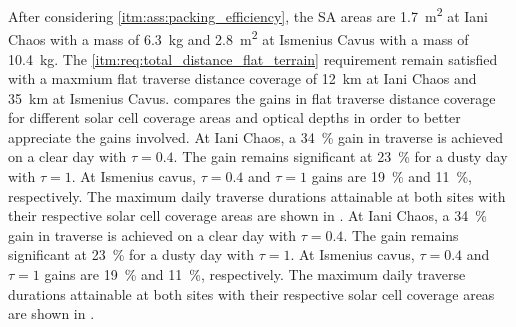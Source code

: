 After considering \ref{itm:ass:packing_efficiency}, the \ac{SA} areas are \SI{1.7}{m^{2}} at Iani Chaos with a mass of \SI{6.3}{\kilo\gram} and \SI{2.8}{m^{2}} at Ismenius Cavus with a mass of  \SI{10.4}{\kilo\gram}. The \ref{itm:req:total_distance_flat_terrain} requirement remain satisfied with
a maxmium flat traverse distance coverage of \SI{12}{\kilo\meter} at Iani Chaos and \SI{35}{\kilo\meter} at Ismenius Cavus.  compares the gains in flat traverse distance coverage for different solar cell coverage areas and optical depths in order to better appreciate the gains involved. At Iani Chaos, a \SI{34}{\percent} gain in traverse is achieved on a clear day with $\tau = 0.4$. The gain remains significant at \SI{23}{\percent} for a dusty day with $\tau = 1$. At Ismenius cavus, $\tau = 0.4$ and $\tau = 1$ gains are \SI{19}{\percent} and \SI{11}{\percent}, respectively. The maximum daily traverse durations attainable at both sites with their respective solar cell coverage areas are shown in . At Iani Chaos, a \SI{34}{\percent} gain in traverse is achieved on a clear day with $\tau = 0.4$. The gain remains significant at \SI{23}{\percent} for a dusty day with $\tau = 1$. At Ismenius cavus, $\tau = 0.4$ and $\tau = 1$ gains are \SI{19}{\percent} and \SI{11}{\percent}, respectively. The maximum daily traverse durations attainable at both sites with their respective solar cell coverage areas are shown in .


